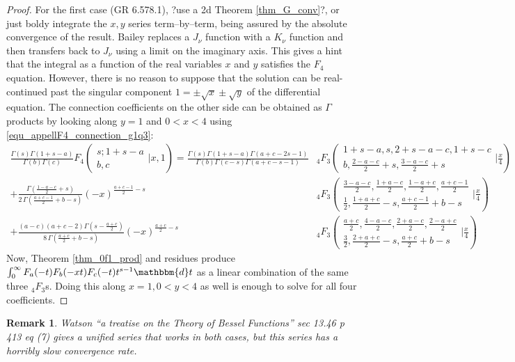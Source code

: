 \documentclass[12pt]{article}
\newcommand{\dd}[0] {\mathbbm{d}}
\numberwithin{equation}{section}
\newtheorem{remark}[theorem]{Remark}
\newcommand{\Head}[3] {{}_{#1}{#2}_{#3}}
\newcommand{\ArgS}[3] {( \begin{smallmatrix} #1 \\ #2 \end{smallmatrix} | {#3})}
\newcommand{\HypJ}[2] {F_{#1}(#2)}
\newcommand{\appellFfourS}[6]    {F_4 \ArgS{{#1};{#2}}{{#3},{#4}}{{#5},{#6}}}
\begin{document}
\begin{proof}
For the first case (GR 6.578.1), ?use a 2d Theorem \ref{thm_G_conv}?, or just boldy integrate the $x,y$ series term--by--term, being assured by the absolute convergence of the result. Bailey replaces a $J_{\nu}$ function with a $K_{\nu}$ function and then transfers back to $J_{\nu}$ using a limit on the imaginary axis. This gives a hint that the integral as a function of the real variables $x$ and $y$ satisfies the $F_4$ equation. However, there is no reason to suppose that the solution can be real-continued past the singular component $1= \pm \sqrt{x} \pm \sqrt{y}$ of the differential equation.
The connection coefficients on the other side can be obtained as $\Gamma$ products by looking along $y=1$ and $0<x<4$ using \eqref{equ_appellF4_connection_g1q3}:
\begin{equation}
\label{equ_appelF4_one}
\begin{aligned}
\tfrac{\Gamma (s) \Gamma (1+s-a)}{\Gamma (b) \Gamma (c)} \appellFfourS{s}{1+s-a}{b}{c}{x}{1} = \tfrac{\Gamma (s) \Gamma (1+s-a) \Gamma (a+c-2 s-1)}{\Gamma (b) \Gamma (c-s) \Gamma (a+c-s-1)} & \Head{4}{F}{3} \ArgS{1+s-a,s,2+s-a-c,1+s-c}{b,\frac{2-a-c}{2}+s,\frac{3-a-c}{2}+s}{\tfrac{x}{4}}\\
+ \tfrac{\Gamma(\frac{1-a-c}{2}+s)}{2 \, \Gamma(\frac{a+c-1}{2}+b-s)} (-x)^{\frac{a+c-1}{2}-s} & \Head{4}{F}{3} \ArgS{\frac{3-a-c}{2},\frac{1+a-c}{2},\frac{1-a+c}{2},\frac{a+c-1}{2}}{\frac{1}{2},\frac{1+a+c}{2}-s,\frac{a+c-1}{2}+b-s}{\tfrac{x}{4}}\\
+ \tfrac{(a-c) (a+c-2) \Gamma (s-\frac{a+c}{2})}{8 \, \Gamma (\frac{a+c}{2}+b-s)} (-x)^{\frac{a+c}{2}-s} & \Head{4}{F}{3} \ArgS{\frac{a+c}{2},\frac{4-a-c}{2},\frac{2+a-c}{2},\frac{2-a+c}{2}}{\frac{3}{2},\frac{2+a+c}{2}-s,\frac{a+c}{2}+b-s}{\tfrac{x}{4}}
\end{aligned}
\end{equation}
Now, Theorem \ref{thm_0f1_prod} and residues produce $\int_{0}^{\infty} \HypJ{a}{-t} \HypJ{b}{-x t} \HypJ{c}{-t} t^{s-1} \dd t$ as a linear combination of the same three $\Head{4}{F}{3}$s. Doing this along $x=1, 0<y<4$ as well is enough to solve for all four coefficients.
\end{proof}
\begin{remark}
Watson ``a treatise on the Theory of Bessel Functions'' sec 13.46 p 413 eq (7) gives a unified series that works in both cases, but this series has a horribly slow convergence rate.
\end{remark}
\end{document}

